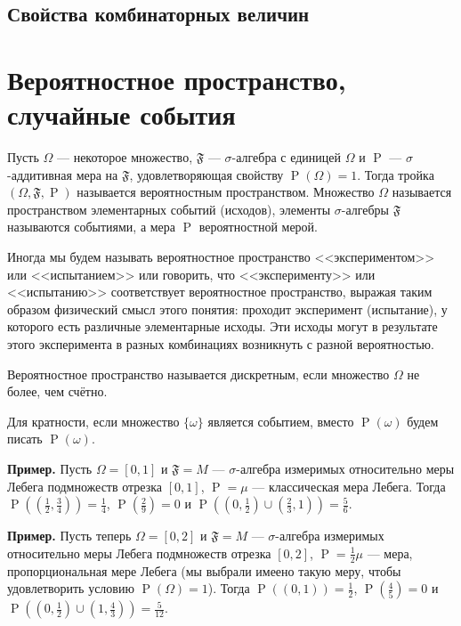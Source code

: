 \documentclass[12pt]{article}
\numberwithin{theorem}{section}
\theoremstyle{definition}
\newenvironment{example}{\indent \textbf{Пример.}}{\indent}
\newcommand{\prob}{\operatorname{P}}
\newcommand{\defin}[2]{\hypertarget{#2}{{\color{red} #1}}}
\newcommand{\events}{\mathfrak{F}}
\begin{document}
	\subsection{Свойства комбинаторных величин}
	
	\section{Вероятностное пространство, случайные события}
	
	Пусть $ \Omega $ --- некоторое множество, $ \mathfrak{F} $ --- $ \sigma $-алгебра с единицей $ \Omega $
	и $ \prob $ --- $ \sigma $-аддитивная мера на $ \mathfrak{F} $, удовлетворяющая свойству $ \prob(\Omega) = 1 $. 
	Тогда тройка $ (\Omega, \mathfrak{F}, \prob) $ называется \defin{вероятностным пространством}{prob-space}.
	Множество $ \Omega $ называется \defin{пространством элементарных событий (исходов)}{space},
	элементы $ \sigma $-алгебры $ \mathfrak{F} $ называются \defin{событиями}{event},
	а мера $ \prob $ \defin{вероятностной мерой}{probability-measure}.
	
	Иногда мы будем называть вероятностное пространство <<экспериментом>> или <<испытанием>>
	или говорить, что <<эксперименту>> или <<испытанию>> соответствует вероятностное пространство,
	выражая таким образом физический смысл этого понятия: проходит эксперимент (испытание), 
	у которого есть различные элементарные исходы. 
	Эти исходы могут в результате этого эксперимента в разных комбинациях возникнуть с разной вероятностью.
	
	Вероятностное пространство называется \defin{дискретным}{discr}, если множество $ \Omega $ не более, чем счётно.
	
	Для кратности, если множество $ \{\omega\} $ является событием, вместо $ \prob({\omega}) $ будем писать $ \prob(\omega) $.
	
	\begin{example}
		Пусть $ \Omega = [0, 1] $ и $ \events = M $ --- $ \sigma $-алгебра измеримых относительно меры Лебега
		подмножеств отрезка $ [0, 1] $, $ \prob = \mu $ --- классическая мера Лебега.
		Тогда $ \prob((\tfrac{1}{2}, \tfrac{3}{4})) = \tfrac{1}{4} $, $ \prob(\tfrac{2}{9}) = 0 $ 
		и $ \prob((0,\tfrac{1}{2}) \cup (\tfrac{2}{3}, 1)) = \tfrac{5}{6} $.
	\end{example}
	
	\begin{example}
		Пусть теперь $ \Omega = [0, 2] $ и $ \events = M $ --- $ \sigma $-алгебра измеримых относительно меры Лебега
		подмножеств отрезка $ [0, 2] $, $ \prob = \tfrac{1}{2}\mu $ --- мера, пропорциональная мере Лебега (мы выбрали имеено такую меру, чтобы удовлетворить условию $ \prob(\Omega) = 1 $).
		Тогда $ \prob((0, 1)) = \tfrac{1}{2} $, $ \prob(\tfrac{4}{5}) = 0 $ и $ \prob((0,\tfrac{1}{2}) \cup (1, \tfrac{4}{3})) = \tfrac{5}{12} $.
	\end{example}
	
\end{document}
